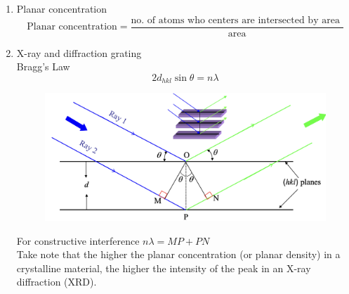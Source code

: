 \documentclass{article}
\begin{document}
\begin{enumerate}
    \item Planar concentration 
    \[\text{Planar concentration} = \frac{\text{no. of atoms who centers are intersected by area }}{\text{area}}\]
    \newpage
    \item X-ray and diffraction grating \\
    Bragg's Law
    \begin{equation}
        2d_{hkl}\sin \theta= n\lambda
    \end{equation}
    \begin{figure}[h]
        \centering
        \includegraphics[width=0.75\linewidth]{image/bragglaw.png}
    \end{figure}
    For constructive interference $\displaystyle n\lambda = MP + PN$ \\
    Take note that  the higher the planar concentration (or planar density) in a crystalline material, the higher the intensity of the peak in an X-ray diffraction (XRD).
    
\end{enumerate}
\end{document}
